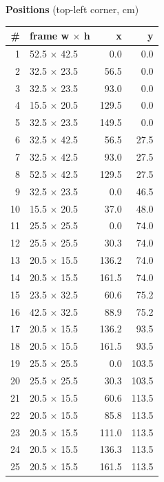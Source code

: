 \documentclass[a4paper,landscape,10pt]{article}
\begin{document}
\begin{minipage}[t]{0.25\textwidth}
\vspace{8pt}
{\bfseries Positions} (top-left corner, cm)\\[2pt]
\tiny
\begin{tabular}{@{}r l r r@{}}
\toprule
\# & frame w $\times$ h & x & y \\
\midrule
1 & 52.5 $\times$ 42.5 & 0.0 & 0.0 \\
2 & 32.5 $\times$ 23.5 & 56.5 & 0.0 \\
3 & 32.5 $\times$ 23.5 & 93.0 & 0.0 \\
4 & 15.5 $\times$ 20.5 & 129.5 & 0.0 \\
5 & 32.5 $\times$ 23.5 & 149.5 & 0.0 \\
6 & 32.5 $\times$ 42.5 & 56.5 & 27.5 \\
7 & 32.5 $\times$ 42.5 & 93.0 & 27.5 \\
8 & 52.5 $\times$ 42.5 & 129.5 & 27.5 \\
9 & 32.5 $\times$ 23.5 & 0.0 & 46.5 \\
10 & 15.5 $\times$ 20.5 & 37.0 & 48.0 \\
11 & 25.5 $\times$ 25.5 & 0.0 & 74.0 \\
12 & 25.5 $\times$ 25.5 & 30.3 & 74.0 \\
13 & 20.5 $\times$ 15.5 & 136.2 & 74.0 \\
14 & 20.5 $\times$ 15.5 & 161.5 & 74.0 \\
15 & 23.5 $\times$ 32.5 & 60.6 & 75.2 \\
16 & 42.5 $\times$ 32.5 & 88.9 & 75.2 \\
17 & 20.5 $\times$ 15.5 & 136.2 & 93.5 \\
18 & 20.5 $\times$ 15.5 & 161.5 & 93.5 \\
19 & 25.5 $\times$ 25.5 & 0.0 & 103.5 \\
20 & 25.5 $\times$ 25.5 & 30.3 & 103.5 \\
21 & 20.5 $\times$ 15.5 & 60.6 & 113.5 \\
22 & 20.5 $\times$ 15.5 & 85.8 & 113.5 \\
23 & 20.5 $\times$ 15.5 & 111.0 & 113.5 \\
24 & 20.5 $\times$ 15.5 & 136.3 & 113.5 \\
25 & 20.5 $\times$ 15.5 & 161.5 & 113.5 \\
\bottomrule
\end{tabular}
\end{minipage}
\clearpage
\end{document}
